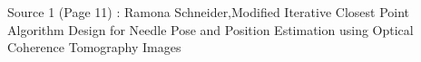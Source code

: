 Source 1 (Page 11) : Ramona Schneider,Modified Iterative Closest Point Algorithm Design for
Needle Pose and Position Estimation using Optical
Coherence Tomography Images